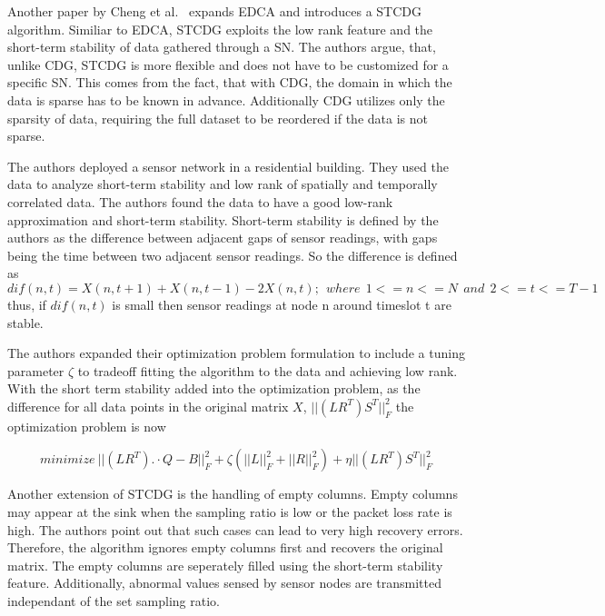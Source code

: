 
\par

Another paper by Cheng et al.~\cite{cheng2013stcdg} expands \ac{EDCA} and
introduces a \ac{STCDG} algorithm. Similiar to \ac{EDCA}, \ac{STCDG} exploits
the low rank feature and the short-term stability of data gathered through a
\ac{SN}. The authors argue, that, unlike \ac{CDG}, \ac{STCDG} is more flexible
and does not have to be customized for a specific \ac{SN}. This comes from the
fact, that with \ac{CDG}, the domain in which the data is sparse has to be
known in advance. Additionally \ac{CDG} utilizes only the sparsity of data,
requiring the full dataset to be reordered if the data is not sparse.

The authors deployed a sensor network in a residential building. They used the
data to analyze short-term stability and low rank of spatially and temporally
correlated data. The authors found the data to have a good low-rank
approximation and short-term stability. Short-term stability is defined by the
authors as the difference between adjacent gaps of sensor readings, with gaps
being the time between two adjacent sensor readings. So the difference is
defined as
$$
dif(n,t) = X(n,t + 1) + X(n,t - 1) - 2X(n, t); \ \ where  \ \ 1 <= n <= N  \ \ and  \ \ 2 <= t <= T - 1
$$
thus, if $ dif(n, t) $ is small then sensor readings at node n around timeslot
t are stable.

The authors expanded their optimization problem formulation to include a tuning
parameter $ \zeta $ to tradeoff fitting the algorithm to the data and achieving
low rank. With the short term stability added into the optimization problem, as
the difference for all data points in the original matrix $ X $, $
||(LR^T)S^T||^2_F $ the optimization problem is now

$$
minimize \ ||(LR^T). \cdot Q-B||^2_F + \zeta(||L||^2_F + ||R||^2_F) + \eta ||(LR^T)S^T||^2_F
$$

Another extension of \ac{STCDG} is the handling of empty columns. Empty
columns may appear at the sink when the sampling ratio is low or the packet
loss rate is high. The authors point out that such cases can lead to very high
recovery errors. Therefore, the algorithm ignores empty columns first and
recovers the original matrix. The empty columns are seperately filled using the
short-term stability feature. Additionally, abnormal values sensed by sensor
nodes are transmitted independant of the set sampling ratio.

